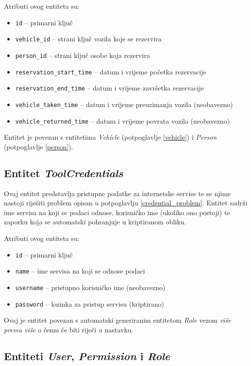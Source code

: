 \documentclass[times, utf8, diplomski]{fer}
\begin{document}
\medskip
Atributi ovog entiteta su:
\begin{itemize}
    \item \texttt{id} -- primarni ključ
    \item \texttt{vehicle\_id} -- strani ključ vozila koje se rezervira
    \item \texttt{person\_id} -- strani ključ osobe koja rezervira
    \item \texttt{reservation\_start\_time} -- datum i vrijeme početka rezervacije
    \item \texttt{reservation\_end\_time} -- datum i vrijeme završetka
        rezervacije
    \item \texttt{vehicle\_taken\_time} -- datum i vrijeme preuzimanja vozila
        (neobavezno)
    \item \texttt{vehicle\_returned\_time} -- datum i vrijeme povrata vozila
        (neobavezno)
\end{itemize}

Entitet je povezan s entitetima \emph{Vehicle} (potpoglavlje \ref{vehicle}) i
\emph{Person} (potpoglavlje \ref{person}).

\subsection{Entitet \emph{ToolCredentials}} \label{tool_credentials}

Ovaj entitet predstavlja pristupne podatke za internetske servise te se njime
nastoji riješiti problem opisan u potpoglavlju \ref{credential_problem}. Entitet
sadrži ime servisa na koji se podaci odnose, korisničko ime (ukoliko ono
postoji) te zaporku koja se automatski pohranjuje u kriptiranom obliku.

\medskip
Atributi ovog entiteta su:
\begin{itemize}
    \item \texttt{id} -- primarni ključ
    \item \texttt{name} -- ime servisa na koji se odnose podaci
    \item \texttt{username} -- pristupno korisničko ime (neobavezno)
    \item \texttt{password} -- lozinka za pristup servisu (kriptirano)
\end{itemize}

Ovaj je entitet povezan s automatski generiranim entitetom \emph{Role} vezom
\emph{više prema više} o čemu će biti riječi u nastavku.

\subsection{Entiteti \emph{User}, \emph{Permission} i \emph{Role}} \label{user_and_role}
\end{document}
